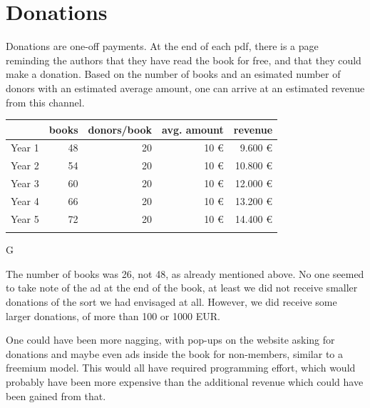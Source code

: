 \documentclass[output=guidelines,nonflat,smallfont,
draftmode
]{langsci/langscibook}
\newcommand{\background}[1]{ 
  \vspace{5mm}
  \renewcommand{\tblslinecolour}{lsDarkBlue}
  \tblssy[red]{explore2}{Background}{\vspace*{-5mm}#1}
}
\newcommand{\langscisolution}[1]{
  \renewcommand{\tblslinecolour}{lsLightBlue}
  \tblssy{langsci}{LangSci solution}{\vspace*{-5mm}#1}
}
\newcommand{\evaluation}[1]{
  \renewcommand{\tblslinecolour}{lsLightOrange}
  \tblssy{receipt}{Evaluation}{\vspace*{-5mm}#1}
}
\newcommand{\othersolutions}[1]{
  \renewcommand{\tblslinecolour}{lsDarkGreenOne}
  \tblssy{more}{Other solutions}{\vspace*{-5mm}#1}
}
\renewcommand{\tblssy}[4][black!12]{%
  \renewcommand{\langscisymbol}{#2}\renewcommand{\tblsboxcolor}{#1}
  \begin{mdframed}[style=yellowexercise,frametitle={#3}]
    #4
  \end{mdframed}
}
\begin{document}
\chapter{Donations} 
\background{Donations are one-off payments. At the end of each pdf, there is a page reminding the authors that they have read the book for free, and that they could make a donation. Based on the number of books and an esimated number of donors with an estimated average amount, one can arrive at an estimated revenue from this channel.}
\langscisolution{
\begin{tabularx}{\textwidth}{Xrrrr}
\lsptoprule 
          &   books   & donors/book &   avg. amount     &  revenue\\
\midrule  
Year 1   &   48      &            20      &            10 €     &                      9.600 €  \\
Year 2   &   54      &            20      &            10 €     &                      10.800 € \\
Year 3   &   60      &            20      &            10 €     &                      12.000 € \\
Year 4   &   66      &            20      &            10 €     &                      13.200 € \\
Year 5   &   72      &            20      &            10 €     &                      14.400 € \\
\lspbottomrule
\end{tabularx}
G}
\evaluation{
The number of books was 26, not 48, as already mentioned above. No one seemed to take note of the ad at the end of the book, at least we did not receive smaller donations of the sort we had envisaged at all. However, we did receive some larger donations, of more than 100 or 1000 EUR. 
}
\othersolutions{One could have been more nagging, with pop-ups on the website asking for donations and maybe even ads inside the book for non-members, similar to a freemium model. This would all have required programming effort, which would probably have been more expensive than the additional revenue which could have been gained from that. }
\end{document}
